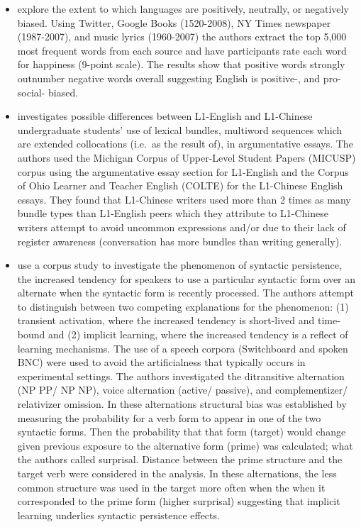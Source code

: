 \documentclass[
]{article}
\newenvironment{rmdblock}[1]
  {\begin{shaded*}
  \begin{itemize}
  \renewcommand{\labelitemi}{
    \raisebox{-.5\height}[0pt][0pt]{
      {\setkeys{Gin}{width=2em,keepaspectratio}\texttt{[image: assets/images/\#1]}}
    }
  }
  \item
  }
  {
  \end{itemize}
  \end{shaded*}
  }
\newenvironment{rmdstudy}
  {\begin{rmdblock}{paper}}
  {\end{rmdblock}}
\begin{document}
\begin{rmdstudy}
\citet{Kloumann2012} explore the extent to which languages are positively, neutrally, or negatively biased. Using Twitter, Google Books (1520-2008), NY Times newspaper (1987-2007), and music lyrics (1960-2007) the authors extract the top 5,000 most frequent words from each source and have participants rate each word for happiness (9-point scale). The results show that positive words strongly outnumber negative words overall suggesting English is positive-, and pro-social- biased.
\end{rmdstudy}

\begin{rmdstudy}
\citet{Bychkovska2017} investigates possible differences between L1-English and L1-Chinese undergraduate students' use of lexical bundles, multiword sequences which are extended collocations (i.e.~as the result of), in argumentative essays. The authors used the Michigan Corpus of Upper-Level Student Papers (MICUSP) corpus using the argumentative essay section for L1-English and the Corpus of Ohio Learner and Teacher English (COLTE) for the L1-Chinese English essays. They found that L1-Chinese writers used more than 2 times as many bundle types than L1-English peers which they attribute to L1-Chinese writers attempt to avoid uncommon expressions and/or due to their lack of register awareness (conversation has more bundles than writing generally).
\end{rmdstudy}

\begin{rmdstudy}
\citet{Jaeger:2007a} use a corpus study to investigate the phenomenon of syntactic persistence, the increased tendency for speakers to use a particular syntactic form over an alternate when the syntactic form is recently processed. The authors attempt to distinguish between two competing explanations for the phenomenon: (1) transient activation, where the increased tendency is short-lived and time-bound and (2) implicit learning, where the increased tendency is a reflect of learning mechanisms. The use of a speech corpora (Switchboard and spoken BNC) were used to avoid the artificialness that typically occurs in experimental settings. The authors investigated the ditransitive alternation (NP PP/ NP NP), voice alternation (active/ passive), and complementizer/ relativizer omission. In these alternations structural bias was established by measuring the probability for a verb form to appear in one of the two syntactic forms. Then the probability that that form (target) would change given previous exposure to the alternative form (prime) was calculated; what the authors called surprisal. Distance between the prime structure and the target verb were considered in the analysis. In these alternations, the less common structure was used in the target more often when the when it corresponded to the prime form (higher surprisal) suggesting that implicit learning underlies syntactic persistence effects.
\end{rmdstudy}
\end{document}
